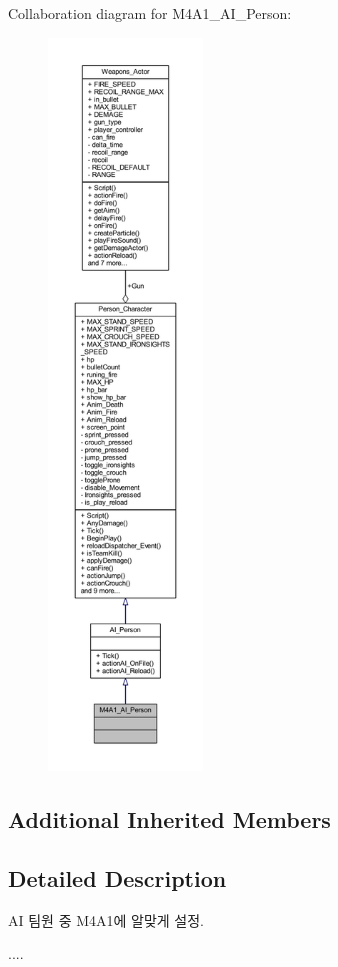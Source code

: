 Collaboration diagram for M4\+A1\+\_\+\+A\+I\+\_\+\+Person\+:\nopagebreak
\begin{figure}[H]
\begin{center}
\leavevmode
\includegraphics[height=550pt]{class_m4_a1___a_i___person__coll__graph}
\end{center}
\end{figure}
\subsection*{Additional Inherited Members}


\subsection{Detailed Description}
AI 팀원 중 M4\+A1에 알맞게 설정. 

.... 